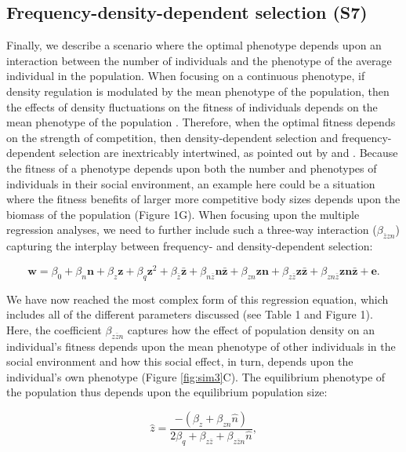 \documentclass{article}
\begin{document}
\subsection{Frequency-density-dependent selection (S7)}
Finally, we describe a scenario where the optimal phenotype depends upon an interaction between the number of individuals and the phenotype of the average individual in the population. When focusing on a continuous phenotype, if density regulation is modulated by the mean phenotype of the population, then the effects of density fluctuations on the fitness of individuals depends on the mean phenotype of the population \citep{Engen2020}. Therefore, when the optimal fitness depends on the strength of competition, then density-dependent selection and frequency-dependent selection are inextricably intertwined, as pointed out by \cite{Smouse1976} and \cite{Heino1998}. Because the fitness of a phenotype depends upon both the number and phenotypes of individuals in their social environment, an example here could be a situation where the fitness benefits of larger more competitive body sizes depends upon the biomass of the population (Figure 1G). When focusing upon the multiple regression analyses, we need to further include such a three-way interaction ($\beta_{\bar{z}zn}$) capturing the interplay between frequency- and density-dependent selection:

\begin{equation} \label{eq: fullw}
\bm{w}=\beta_{0} +\beta_{n} \bm{n} + \beta_{z} \bm{z} + \beta_{q} \bm{z}^2 + \beta_{\bar{z}} \bm{\bar{z}}  +   \beta_{n\bar{z}} \bm{n\bar{z}} +   \beta_{zn} \bm{zn} + \beta_{z\bar{z}} \bm{z\bar{z}}   +   \beta_{zn\bar{z}} \bm{zn\bar{z}} + \bm{e}.
\end{equation}

\noindent We have now reached the most complex form of this regression equation, which includes all of the different parameters discussed (see Table 1 and Figure 1). Here, the coefficient $\beta_{z\bar{z}n}$ captures how the effect of population density on an individual's fitness depends upon the mean phenotype of other individuals in the social environment and how this social effect, in turn, depends upon the individual's own phenotype (Figure \ref{fig:sim3}C). The equilibrium phenotype of the population thus depends upon the equilibrium population size: 

\begin{equation} 
\hat{z}=\frac{-(\beta_{z}+\beta_{zn}\hat{n})}{2\beta_{q} + \beta_{z\bar{z}} + \beta_{z\bar{z}n}\hat{n}},
\end{equation} 
\end{document}
